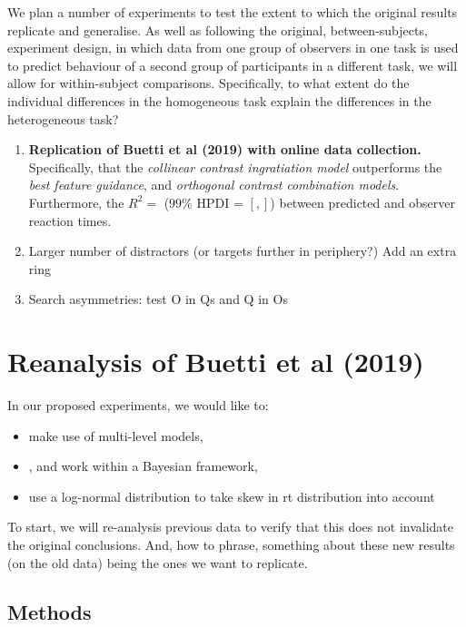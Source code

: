 We plan a number of experiments to test the extent to which the original results replicate and generalise. As well as following the original, between-subjects, experiment design, in which data from one group of observers in one task is used to predict behaviour of a second group of participants in a different task, we will allow for within-subject comparisons. Specifically, to what extent do the individual differences in the homogeneous task explain the differences in the heterogeneous task? 

\begin{enumerate}
\item \textbf{Replication of Buetti et al (2019) with online data collection.} Specifically, that the \textit{collinear contrast ingratiation model} outperforms the \textit{best feature guidance}, and \textit{orthogonal contrast combination models}.  Furthermore, the $R^2 = $ ($99\%$ HPDI = $[, ]$) between predicted and observer reaction times.\\
\item Larger number of distractors (or targets further in periphery?) Add an extra ring \\ 
\item Search asymmetries: test O in Qs and Q in Os \\
\end{enumerate}

\section{Reanalysis of Buetti et al (2019)}

In our proposed experiments, we would like to:
\begin{itemize} 
\item make use of multi-level models, \\
\item, and work within a Bayesian framework, \\
\item use a log-normal distribution to take skew in rt distribution into account \\
\end{itemize}

To start, we will re-analysis previous data to verify that this does not invalidate the original conclusions. And, how to phrase, something about these new results (on the old data) being the ones we want to replicate. 

\subsection{Methods}

